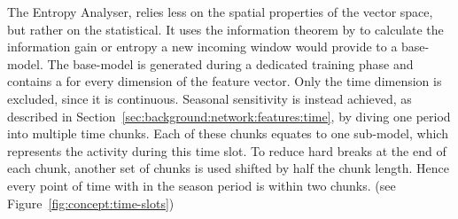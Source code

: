 The Entropy Analyser, relies less on the spatial properties of the vector space, but rather on the statistical.
It uses the information theorem by \textcite{Shannon1948} to calculate the information gain or entropy a new incoming window would provide to a base-model.
The base-model is generated during a dedicated training phase and contains a  for every dimension of the feature vector. Only the time dimension is excluded, since it is continuous.
Seasonal sensitivity is instead achieved, as described in Section~\ref{sec:background:network:features:time}, by diving one period into multiple time chunks. Each of these chunks equates to one sub-model, which represents the activity during this time slot. To reduce hard breaks at the end of each chunk, another set of chunks is used shifted by half the chunk length. Hence every point of time with in the season period is within two chunks. (see Figure~\ref{fig:concept:time-slots})

